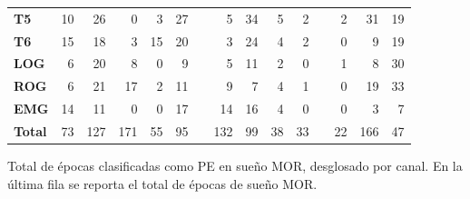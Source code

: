 \documentclass[12pt,a4paper]{mitthesis}
\begin{document}
\begin{SidewaysTable}
\begin{tabular}{lrrrrrcrrrrcrrr}
\textbf{T5} &10&26&0 &3 &27&&5 &34&5 &2 &&2 &31&19 \\
\rowcolor{gris}
\textbf{T6} &15&18&3 &15&20&&3 &24&4 &2 &&0 &9 &19 \\
\textbf{LOG}&6 &20&8 &0 &9 &&5 &11&2 &0 &&1 &8 &30 \\
\textbf{ROG}&6 &21&17&2 &11&&9 &7 &4 &1 &&0 &19&33 \\
\textbf{EMG}&14&11&0 &0 &17&&14&16&4 &0 &&0&3&7 \\
\rowcolor{gris2}
\textbf{Total}&73&127&171&55&95&&132&99&38&33&&22&166&47 \\
\bottomrule
\end{tabular}
\caption{Total de \'epocas clasificadas como PE en sue\~no MOR, desglosado por canal. En la 
\'ultima fila se reporta el total de \'epocas de sue\~no MOR.
}
\label{total_gpos_mor}
\end{SidewaysTable}

\end{document}
